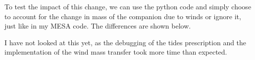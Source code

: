 \documentclass[a4paper,10pt]{article}
\begin{document}
To test the impact of this change, we can use the python code and simply choose to account for the change in mass of the companion due to winds or ignore it, just like in my MESA code. The differences are shown below.

\begin{figure}[ht]
    \centering
\end{figure}

I have not looked at this yet, as the debugging of the tides prescription and the implementation of the wind mass transfer took more time than expected.




\end{document}

